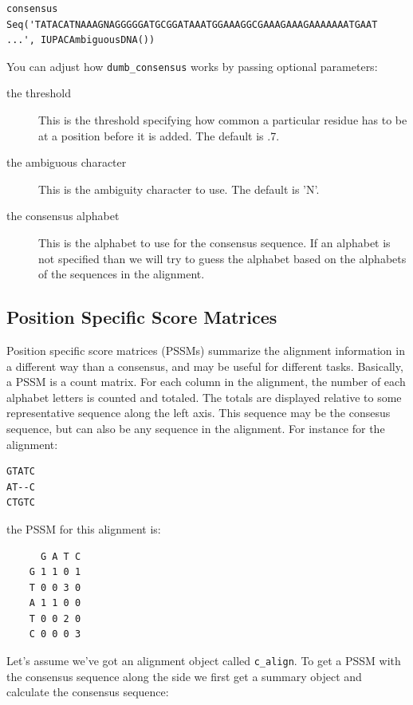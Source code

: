 \documentclass{report}
\begin{document}
\begin{verbatim}
consensus Seq('TATACATNAAAGNAGGGGGATGCGGATAAATGGAAAGGCGAAAGAAAGAAAAAAATGAAT 
...', IUPACAmbiguousDNA())
\end{verbatim} 

You can adjust how \verb|dumb_consensus| works by passing optional parameters:

\begin{description}
\item[the threshold] This is the threshold specifying how common a particular residue has to be at a position before it is added. The default is .7.

\item[the ambiguous character] This is the ambiguity character to use. The default is 'N'.

\item[the consensus alphabet] This is the alphabet to use for the consensus sequence. If an alphabet is not specified than we will try to guess the alphabet based on the alphabets of the sequences in the alignment.
\end{description}

\subsection{Position Specific Score Matrices}
\label{sec:pssm}

Position specific score matrices (PSSMs) summarize the alignment information in a different way than a consensus, and may be useful for different tasks. Basically, a PSSM is a count matrix. For each column in the alignment, the number of each alphabet letters is counted and totaled. The totals are displayed relative to some representative sequence along the left axis. This sequence may be the consesus sequence, but can also be any sequence in the alignment. For instance for the alignment:

\begin{verbatim}
GTATC
AT--C
CTGTC
\end{verbatim}

the PSSM for this alignment is:

\begin{verbatim}
      G A T C
    G 1 1 0 1
    T 0 0 3 0
    A 1 1 0 0
    T 0 0 2 0
    C 0 0 0 3
\end{verbatim}

Let's assume we've got an alignment object called \verb|c_align|. To get a PSSM with the consensus sequence along the side we first get a summary object and calculate the consensus sequence:
\end{document}
